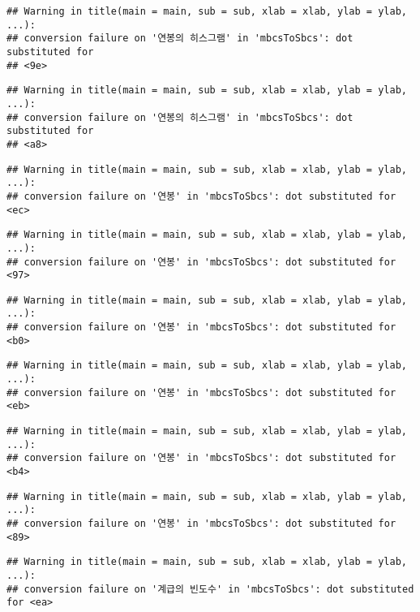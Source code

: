 \documentclass[
]{article}
\begin{document}
\begin{verbatim}
## Warning in title(main = main, sub = sub, xlab = xlab, ylab = ylab, ...):
## conversion failure on '연봉의 히스그램' in 'mbcsToSbcs': dot substituted for
## <9e>
\end{verbatim}

\begin{verbatim}
## Warning in title(main = main, sub = sub, xlab = xlab, ylab = ylab, ...):
## conversion failure on '연봉의 히스그램' in 'mbcsToSbcs': dot substituted for
## <a8>
\end{verbatim}

\begin{verbatim}
## Warning in title(main = main, sub = sub, xlab = xlab, ylab = ylab, ...):
## conversion failure on '연봉' in 'mbcsToSbcs': dot substituted for <ec>
\end{verbatim}

\begin{verbatim}
## Warning in title(main = main, sub = sub, xlab = xlab, ylab = ylab, ...):
## conversion failure on '연봉' in 'mbcsToSbcs': dot substituted for <97>
\end{verbatim}

\begin{verbatim}
## Warning in title(main = main, sub = sub, xlab = xlab, ylab = ylab, ...):
## conversion failure on '연봉' in 'mbcsToSbcs': dot substituted for <b0>
\end{verbatim}

\begin{verbatim}
## Warning in title(main = main, sub = sub, xlab = xlab, ylab = ylab, ...):
## conversion failure on '연봉' in 'mbcsToSbcs': dot substituted for <eb>
\end{verbatim}

\begin{verbatim}
## Warning in title(main = main, sub = sub, xlab = xlab, ylab = ylab, ...):
## conversion failure on '연봉' in 'mbcsToSbcs': dot substituted for <b4>
\end{verbatim}

\begin{verbatim}
## Warning in title(main = main, sub = sub, xlab = xlab, ylab = ylab, ...):
## conversion failure on '연봉' in 'mbcsToSbcs': dot substituted for <89>
\end{verbatim}

\begin{verbatim}
## Warning in title(main = main, sub = sub, xlab = xlab, ylab = ylab, ...):
## conversion failure on '계급의 빈도수' in 'mbcsToSbcs': dot substituted for <ea>
\end{verbatim}
\end{document}

